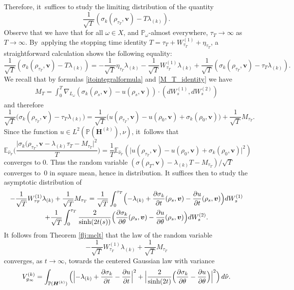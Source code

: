 \documentclass[10pt]{amsart}
\theoremstyle{plain}
\theoremstyle{definition}
\numberwithin{equation}{subsection}
\newcommand\bE{\mathbb{E}}
\newcommand\bP{\mathbb{P}}
\let\gradient\nabla
\newcommand{\bfH}{\boldsymbol{H}}
\newcommand{\bfv}{\boldsymbol{v}}
\begin{document}
Therefore, it~suffices to study the limiting distribution of the quantity
\[
\frac{1}{\sqrt{T}} (\sigma_k(\rho_{\tau_{T}}, \bfv)- T\lambda_{(k)}).
\] Observe that we have that for all $\omega \in X$, and $\bP_\omega$-almost everywhere, $\tau_T \to \infty$ as $T\to\infty$. By~applying the stopping time identity $T = \tau_T + W_{\tau_T}^{(1)} + \eta_{\tau_T}$, a straightforward calculation shows the following equality:
\[
\frac{1}{\sqrt{T}} (\sigma_k(\rho_{\tau_T},\bfv)- T\lambda_{(k)}) =-\frac{1}{\sqrt{T}}\eta_{\tau_T}\lambda_{(k)} \label{etas} -\frac{1}{\sqrt{T}}W_{\tau_T}^{(1)}\lambda_{(k)}+\frac{1}{\sqrt{T}}(\sigma_k(\rho_{\tau_T},\bfv) -\tau_T \lambda_{(k)}).
\]
We recall that by formulas \eqref{itointegralformula} and
\eqref{M_T_identity} we have
\begin{align*}
M_T = \int_0^T \gradient_{L_\omega} (\sigma_k(\rho_s,\bfv)-u(\rho_s,\bfv)) \cdot (dW^{(1)}_s,dW^{(2)}_s)
\end{align*}
and therefore
\[
\frac{1}{\sqrt{T}} \big(\sigma_k(\rho_{\tau_T},\bfv) - \tau_T\lambda_{(k)}\big) = \frac{1}{\sqrt{T}}\big(u(\rho_{\tau_T},\bfv)-u(\rho_0,\bfv) +\sigma_k(\rho_0,\bfv) \big) + \frac{1}{\sqrt{T}}M_{\tau_T}.
\]
Since the function $u \in L^2(\bP(\bfH^{(k)}),\nu)$, it~follows that
\[
\bE_{{\hat{\nu}_\bP}}\Big(\frac{\vert \sigma_k(\rho_{\tau_T},{\bfv} -\lambda_{(k)} \tau_T - M_{\tau_T}\vert^2}{T}\Big) = \frac{1}{T} \bE_{{\hat{\nu}_\bP}}(\vert u(\rho_{\tau_T}, \bfv)- u(\rho_0, \bfv) + \sigma_k(\rho_0, \bfv)\vert^2)
\]
converges to $0$. Thus the random variable $(\sigma(\rho_T,{\bfv}) -\lambda_{(k)} T-M_{\tau_T})/\sqrt{T}$ converges to~$0$ in square mean, hence in distribution.
It suffices then to study the asymptotic distribution of
\begin{multline*}
-\frac{1}{\sqrt{T}}W_{\tau_T}^{(1)}\lambda_{(k)}+\frac{1}{\sqrt{T}}M_{\tau_T}= \frac{1}{\sqrt{T}}\int_0^{\tau_T}\Bigl(-\lambda_{(k)}+\frac{\partial\sigma_k}{\partial t}(\rho_s, \bfv)- \frac{\partial u}{\partial t}(\rho_s,\bfv)\Bigr)dW_s^{(1)}\\
+\frac{1}{\sqrt{T}}\int_0^{\tau_T}\frac{2}{\sinh(2t(s))}\Bigl(\frac{\partial\sigma_k}{\partial \theta}(\rho_s, \bfv)- \frac{\partial u}{\partial \theta}(\rho_s,\bfv)\Bigr)dW_s^{(2)}.
\end{multline*}
It follows from Theorem \ref{flj:mclt} that the
law of the random variable
\[
-\frac{1}{\sqrt{T}}W_{\tau_T}^{(1)}\lambda_{(k)}+\frac{1}{\sqrt{T}}M_{\tau_T}
\] converges, as \(t \to \infty\), towards the centered Gaussian law with variance
\[
V^{(k)}_{g_\infty}= \int_{\bP(\bfH^{(k)})} \Big(\Bigl\vert -\lambda_{(k)}+\frac{\partial\sigma_k}{\partial t}- \frac{\partial u}{\partial t} \Bigr\vert^2 + \Bigl\vert\frac{2}{\sinh(2t)} \Bigl(\frac{\partial\sigma_k}{\partial \theta}- \frac{\partial u}{\partial \theta} \Bigr) \Bigr\vert^2 \Big)\, d\hat\nu.
\]
\end{document}
